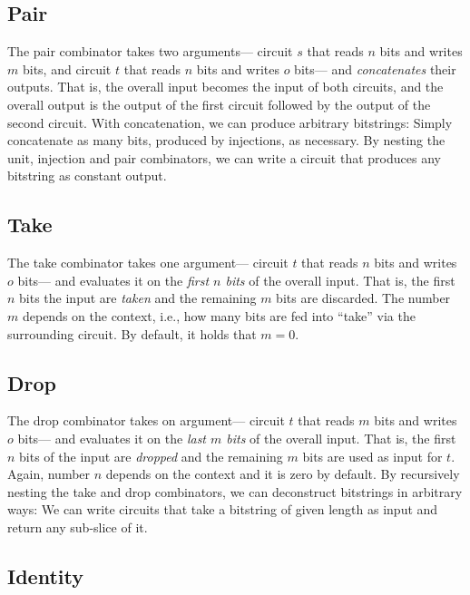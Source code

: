 \subsection{Pair}


%
The pair combinator takes two arguments---%
circuit $s$ that reads $n$ bits and writes $m$ bits,
and circuit $t$ that reads $n$ bits and writes $o$ bits---%
and \emph{concatenates} their outputs.
That is,
the overall input becomes the input of both circuits,
and the overall output is the output of the first circuit followed by the output of the second circuit.
%
With concatenation,
we can produce arbitrary bitstrings:
Simply concatenate as many bits, produced by injections, as necessary.
%
By nesting the unit, injection and pair combinators,
we can write a circuit that produces any bitstring as constant output.

\subsection{Take}


%
The take combinator takes one argument---%
circuit $t$ that reads $n$ bits and writes $o$ bits---%
and evaluates it on the \emph{first $n$ bits} of the overall input.
That is,
the first $n$ bits the input are \emph{taken} and the remaining $m$ bits are discarded.
The number $m$ depends on the context,
i.e., how many bits are fed into \enquote{take} via the surrounding circuit.
By default, it holds that $m = 0$.

\subsection{Drop}


%
The drop combinator takes on argument---%
circuit $t$ that reads $m$ bits and writes $o$ bits---%
and evaluates it on the \emph{last $m$ bits} of the overall input.
That is,
the first $n$ bits of the input are \emph{dropped} and the remaining $m$ bits are used as input for $t$.
Again,
number $n$ depends on the context and it is zero by default.
%
By recursively nesting the take and drop combinators,
we can deconstruct bitstrings in arbitrary ways:
We can write circuits that take a bitstring of given length as input and return any sub-slice of it.

\subsection{Identity}

